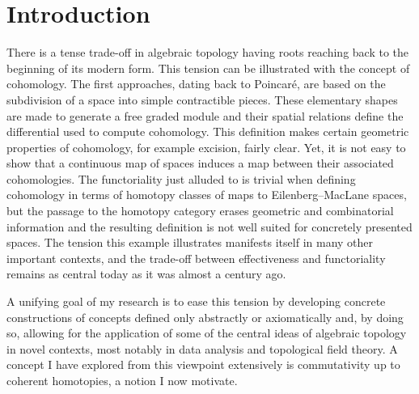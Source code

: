 \section*{Introduction} \label{s:introduction}

There is a tense trade-off in algebraic topology having roots reaching back to the beginning of its modern form.
This tension can be illustrated with the concept of cohomology.
The first approaches, dating back to Poincar\'e, are based on the subdivision of a space into simple contractible pieces.
These elementary shapes are made to generate a free graded module and their spatial relations define the differential used to compute cohomology.
This definition makes certain geometric properties of cohomology, for example excision, fairly clear.
Yet, it is not easy to show that a continuous map of spaces induces a map between their associated cohomologies.
The functoriality just alluded to is trivial when defining cohomology in terms of homotopy classes of maps to Eilenberg--MacLane spaces, but the passage to the homotopy category erases geometric and combinatorial information and the resulting definition is not well suited for concretely presented spaces.
The tension this example illustrates manifests itself in many other important contexts, and the trade-off between effectiveness and functoriality remains as central today as it was almost a century ago.

A unifying goal of my research is to ease this tension by developing concrete constructions of concepts defined only abstractly or axiomatically and, by doing so, allowing for the application of some of the central ideas of algebraic topology in novel contexts, most notably in data analysis and topological field theory.
A concept I have explored from this viewpoint extensively is commutativity up to coherent homotopies, a notion I now motivate.


